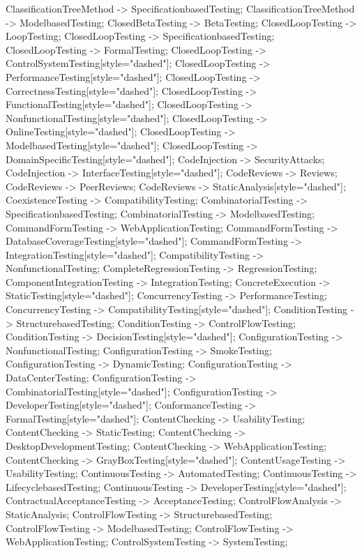 \documentclass{article}
\begin{document}
{ClassificationTreeMethod -> SpecificationbasedTesting;
ClassificationTreeMethod -> ModelbasedTesting;
ClosedBetaTesting -> BetaTesting;
ClosedLoopTesting -> LoopTesting;
ClosedLoopTesting -> SpecificationbasedTesting;
ClosedLoopTesting -> FormalTesting;
ClosedLoopTesting -> ControlSystemTesting[style="dashed"];
ClosedLoopTesting -> PerformanceTesting[style="dashed"];
ClosedLoopTesting -> CorrectnessTesting[style="dashed"];
ClosedLoopTesting -> FunctionalTesting[style="dashed"];
ClosedLoopTesting -> NonfunctionalTesting[style="dashed"];
ClosedLoopTesting -> OnlineTesting[style="dashed"];
ClosedLoopTesting -> ModelbasedTesting[style="dashed"];
ClosedLoopTesting -> DomainSpecificTesting[style="dashed"];
CodeInjection -> SecurityAttacks;
CodeInjection -> InterfaceTesting[style="dashed"];
CodeReviews -> Reviews;
CodeReviews -> PeerReviews;
CodeReviews -> StaticAnalysis[style="dashed"];
CoexistenceTesting -> CompatibilityTesting;
CombinatorialTesting -> SpecificationbasedTesting;
CombinatorialTesting -> ModelbasedTesting;
CommandFormTesting -> WebApplicationTesting;
CommandFormTesting -> DatabaseCoverageTesting[style="dashed"];
CommandFormTesting -> IntegrationTesting[style="dashed"];
CompatibilityTesting -> NonfunctionalTesting;
CompleteRegressionTesting -> RegressionTesting;
ComponentIntegrationTesting -> IntegrationTesting;
ConcreteExecution -> StaticTesting[style="dashed"];
ConcurrencyTesting -> PerformanceTesting;
ConcurrencyTesting -> CompatibilityTesting[style="dashed"];
ConditionTesting -> StructurebasedTesting;
ConditionTesting -> ControlFlowTesting;
ConditionTesting -> DecisionTesting[style="dashed"];
ConfigurationTesting -> NonfunctionalTesting;
ConfigurationTesting -> SmokeTesting;
ConfigurationTesting -> DynamicTesting;
ConfigurationTesting -> DataCenterTesting;
ConfigurationTesting -> CombinatorialTesting[style="dashed"];
ConfigurationTesting -> DeveloperTesting[style="dashed"];
ConformanceTesting -> FormalTesting[style="dashed"];
ContentChecking -> UsabilityTesting;
ContentChecking -> StaticTesting;
ContentChecking -> DesktopDevelopmentTesting;
ContentChecking -> WebApplicationTesting;
ContentChecking -> GrayBoxTesting[style="dashed"];
ContentUsageTesting -> UsabilityTesting;
ContinuousTesting -> AutomatedTesting;
ContinuousTesting -> LifecyclebasedTesting;
ContinuousTesting -> DeveloperTesting[style="dashed"];
ContractualAcceptanceTesting -> AcceptanceTesting;
ControlFlowAnalysis -> StaticAnalysis;
ControlFlowTesting -> StructurebasedTesting;
ControlFlowTesting -> ModelbasedTesting;
ControlFlowTesting -> WebApplicationTesting;
ControlSystemTesting -> SystemTesting;
}
\end{document}
